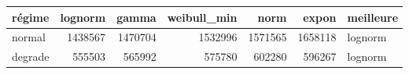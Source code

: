 \begin{tabular}{lrrrrrl}
\toprule
régime & lognorm & gamma & weibull\_min & norm & expon & meilleure \\
\midrule
normal & 1438567 & 1470704 & 1532996 & 1571565 & 1658118 & lognorm \\
degrade & 555503 & 565992 & 575780 & 602280 & 596267 & lognorm \\
\bottomrule
\end{tabular}
